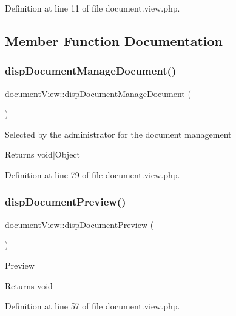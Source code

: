 Definition at line 11 of file document.\+view.\+php.



\subsection{Member Function Documentation}
\mbox{\label{classdocumentView_a5a358d7106e98e64179115b3966639de}} 
\subsubsection{\texorpdfstring{disp\+Document\+Manage\+Document()}{dispDocumentManageDocument()}}
{\footnotesize\ttfamily document\+View\+::disp\+Document\+Manage\+Document (\begin{DoxyParamCaption}{ }\end{DoxyParamCaption})}

Selected by the administrator for the document management \begin{DoxyReturn}{Returns}
void$\vert$\+Object 
\end{DoxyReturn}


Definition at line 79 of file document.\+view.\+php.

\mbox{\label{classdocumentView_af93051602dbf3254f05d1d0ada402907}} 
\subsubsection{\texorpdfstring{disp\+Document\+Preview()}{dispDocumentPreview()}}
{\footnotesize\ttfamily document\+View\+::disp\+Document\+Preview (\begin{DoxyParamCaption}{ }\end{DoxyParamCaption})}

Preview \begin{DoxyReturn}{Returns}
void 
\end{DoxyReturn}


Definition at line 57 of file document.\+view.\+php.

